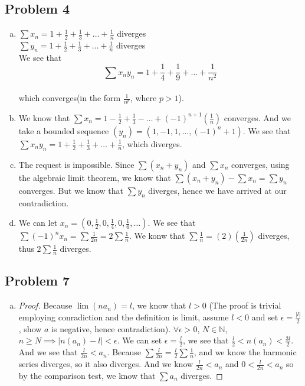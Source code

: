 \documentclass[12pt]{article}
\begin{document}
\subsection*{Problem 4}
\begin{enumerate}[a).]
    \item {
        $\sum x_n = 1 + \frac{1}{2} + \frac{1}{3} + \dots + \frac{1}{n}$ diverges\\

        $\sum y_n = 1 + \frac{1}{2} + \frac{1}{3} + \dots + \frac{1}{n}$ diverges\\

        We see that 
        $$\sum x_ny_n = 1 + \frac{1}{4} + \frac{1}{9} + \dots + \frac{1}{n^2}$$\\
        which converges(in the form $\frac{1}{n^p}$, where $p > 1$).
    }
    \item {
        We know that $\sum x_n = 1 - \frac{1}{2} + \frac{1}{3} - \dots + (-1)^{n+1}(\frac{1}{n})$ converges.
        And we take a bounded sequence $(y_n) = (1, -1, 1, \dots, (-1)^n+1)$. 
        We see that $\sum x_ny_n = 1 + \frac{1}{2} + \frac{1}{3} + \dots + \frac{1}{n}$, which diverges.

    }
    \item {
        The request is impossible.
        Since $\sum (x_n + y_n)$ and $\sum x_n$ converges, using the algebraic limit theorem, we know that $\sum(x_n + y_n) - \sum x_n = \sum y_n$ converges.
        But we know that $\sum y_n$ diverges, hence we have arrived at our contradiction.
    }
    \item {
        We can let $x_n = (0, \frac{1}{2}, 0, \frac{1}{4}, 0, \frac{1}{6}, \dots)$. 
        We see that $\sum (-1)^n x_n = \sum \frac{1}{2n} = 2 \sum \frac{1}{n}$. 
        We konw that $\sum \frac{1}{n} = (2)(\frac{1}{2n})$ diverges, thus $2 \sum \frac{1}{n}$ diverges.
    }
\end{enumerate}


\subsection*{Problem 7}
\begin{enumerate}[a).]
    \item {
        \begin{proof}
            Because $\lim (n a_n) = l$, we know that $l > 0$ (The proof is trivial employing conradiction and the definition is limit, assume $l < 0$ and set $\epsilon = \frac{|l|}{2}$, show $a$ is negative, hence contradiction).
            $\forall \epsilon > 0$, $N \in \mathbb{N}$, $ n \ge N \implies |n(a_n) - l | < \epsilon$. 
            We can set $\epsilon = \frac{l}{2}$, we see that $\frac{l}{2} < n(a_n) < \frac{3l}{2}$. 
            And we see that $\frac{l}{2n} < a_n$. 
            Because $\sum \frac{l}{2n} = \frac{l}{2}\sum\frac{1}{n}$, and we know the harmonic series diverges, so it also diverges. 
            And we know $\frac{l}{2n} < a_n$ and $0 < \frac{l}{2n} < a_n$ so by the comparison test, we know that $\sum a_n$ diverges.
        \end{proof}
    }
\end{enumerate}
\end{document}
